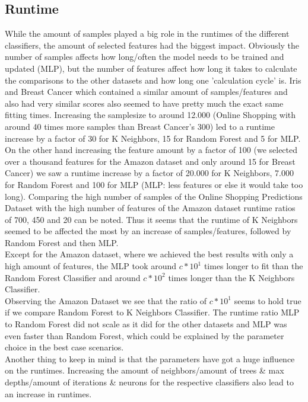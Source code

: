 \documentclass{article}
\begin{document}
\subsection{Runtime}
While the amount of samples played a big role in the runtimes of the different classifiers, the amount of selected features had the biggest impact. Obviously the number of samples affects how long/often the model needs to be trained and updated (MLP), but the number of features affect how long it takes to calculate the comparisons to the other datasets and how long one 'calculation cycle' is. Iris and Breast Cancer which contained a similar amount of samples/features and also had very similar scores also seemed to  have pretty much the exact same fitting times. Increasing the samplesize to around 12.000 (Online Shopping with around 40 times more samples than Breast Cancer's 300) led to a runtime increase by a factor of 30 for K Neighbors, 15 for Random Forest and 5 for MLP.\\ On the other hand increasing the feature amount by a factor of 100 (we selected over a thousand features for the Amazon dataset and only around 15 for Breast Cancer) we saw a runtime increase by a factor of 20.000 for K Neighbors, 7.000 for Random Forest and 100 for MLP (MLP: less features or else it would take too long). 
Comparing the high number of samples of the Online Shopping Predictions Dataset with the high number of features of the Amazon dataset runtime ratios of 700, 450 and 20 can be noted. Thus it seems that the runtime of K Neighbors seemed to be affected the most by an increase of samples/features, followed by Random Forest and then MLP. \\
\newline
Except for the Amazon dataset, where we achieved the best results with only a high amount of features, the MLP took around $c*10^1$ times longer to fit than the Random Forest Classifier and around $c* 10^2$ times longer than the K Neighbors Classifier.\\
Observing the Amazon Dataset we see that the ratio of $c*10^1$ seems to hold true if we compare Random Forest to K Neighbors Classifier. The runtime ratio MLP to Random Forest did not scale as it did for the other datasets and MLP was even faster than Random Forest, which could be explained by the parameter choice in the best case scenarios. \\
Another thing to keep in mind is that the parameters have got a huge influence on the runtimes. Increasing the amount of neighbors/amount of trees \& max depths/amount of iterations \& neurons for the respective classifiers also lead to an increase in runtimes.
\end{document}

